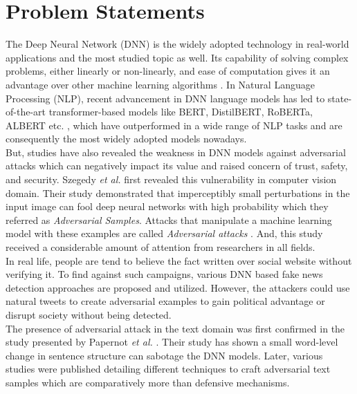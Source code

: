 \documentclass[%
	BCOR=8mm, %
	DIV=12,
	toc=bibliography, %
	toc=listof, %
	oneside, %
	egregdoesnotlikesansseriftitles, %
	]{scrbook}
\begin{document}
\section{Problem Statements}
The Deep Neural Network (DNN) is the widely  adopted technology in real-world applications and the most studied topic as well. Its capability of solving complex problems, either linearly or non-linearly, and ease of computation gives it an advantage over other machine learning algorithms \cite{huq_adversarial_2020-1}. In Natural Language Processing (NLP), recent advancement in DNN  language models  has led to state-of-the-art transformer-based models like BERT,  DistilBERT, RoBERTa, ALBERT etc. \cite{devlin_bert_2019-1,liu_roberta_2019-1,sanh_distilbert_2020,lan_albert_2020}, which have outperformed in a wide range of NLP tasks  and are consequently the most widely adopted models nowadays.\\
But, studies have also revealed the weakness in DNN models against adversarial attacks \cite{szegedy_intriguing_2014,yuan_adversarial_2018,akhtar_threat_2018,huq_adversarial_2020-1,zhang_adversarial_2019} which can negatively impact its value and raised concern of trust, safety, and security. Szegedy \textit{et al.} \cite{szegedy_intriguing_2014} first revealed this vulnerability in computer vision domain. Their study demonstrated that imperceptibly small perturbations in the input image can fool deep neural networks with high probability which they referred  as \textit{Adversarial Samples}. Attacks that manipulate a machine learning model with these examples are called \textit{Adversarial attacks} \cite{nicolae_adversarial_2019}. And, this study received a considerable amount of attention from researchers in all fields. \\
In real life, people are tend to believe the fact written over social website without verifying it. To find against such campaigns, various DNN based fake news detection approaches are proposed and utilized.  However, the attackers could use natural tweets to create adversarial examples to gain political advantage or disrupt society without being detected. \\
The presence of adversarial attack in the text domain was first confirmed in the study presented by Papernot \textit{et al.} \cite{papernot_crafting_2016}. Their  study has shown  a small word-level change in sentence structure can sabotage the DNN models. Later, various studies were published detailing different techniques to craft adversarial text samples which are comparatively more than defensive mechanisms. \\
\end{document}
